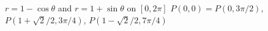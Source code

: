 {$r=1-\cos\theta$ and $r=1+\sin\theta$ on $[0,2\pi]$}
{$P(0,0)=P(0,3\pi/2)$,  $P(1+\sqrt{2}/2,3\pi/4)$, $P(1-\sqrt{2}/2,7\pi/4)$
}
